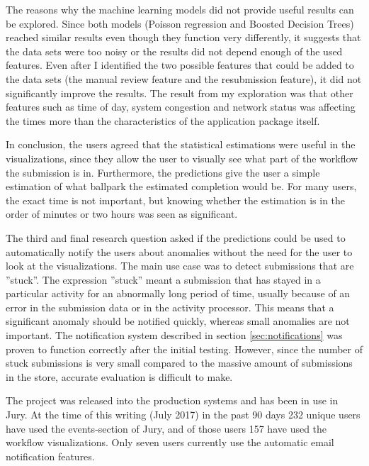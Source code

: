 
The reasons why the machine learning models did not provide useful results can be explored.
Since both models (Poisson regression and Boosted Decision Trees) reached similar results even though they function very differently, it suggests that the data sets were too noisy or the results did not depend enough of the used features.
Even after I identified the two possible features that could be added to the data sets (the manual review feature and the resubmission feature), it did not significantly improve the results.
The result from my exploration was that other features such as time of day, system congestion and network status was affecting the times more than the characteristics of the application package itself.

In conclusion, the users agreed that the statistical estimations were useful in the visualizations, since they allow the user to visually see what part of the workflow the submission is in.
Furthermore, the predictions give the user a simple estimation of what ballpark the estimated completion would be. 
For many users, the exact time is not important, but knowing whether the estimation is in the order of minutes or two hours was seen as significant.


The third and final research question asked if the predictions could be used to automatically notify the users about anomalies without the need for the user to look at the visualizations.
The main use case was to detect submissions that are ''stuck''.
The expression ''stuck'' meant a submission that has stayed in a particular activity for an abnormally long period of time, usually because of an error in the submission data or in the activity processor.
This means that a significant anomaly should be notified quickly, whereas small anomalies are not important.
The notification system described in section \ref{sec:notifications} was proven to function correctly after the initial testing. 
However, since the number of stuck submissions is very small compared to the massive amount of submissions in the store, accurate evaluation is difficult to make.

The project was released into the production systems and has been in use in Jury.
At the time of this writing (July 2017) in the past 90 days 232 unique users have used the events-section of Jury, and of those users 157 have used the workflow visualizations.
Only seven users currently use the automatic email notification features.

